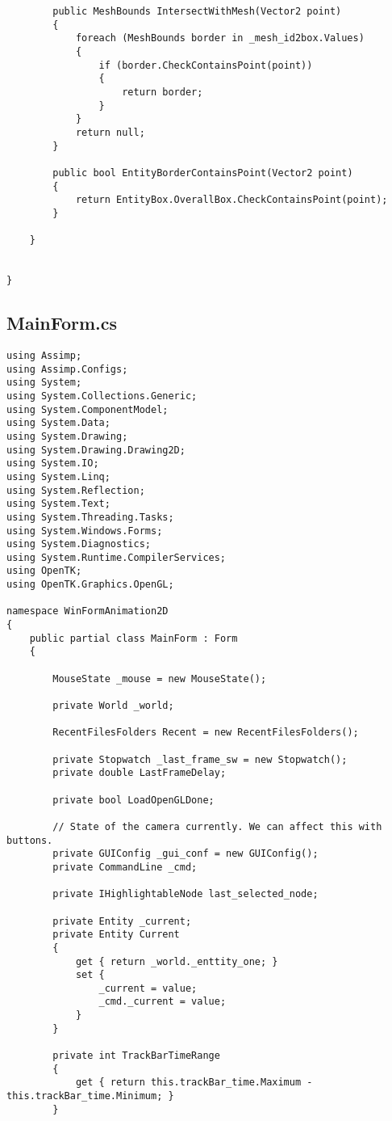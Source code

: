 \begin{scriptsize}
\begin{verbatim}
        public MeshBounds IntersectWithMesh(Vector2 point)
        {
            foreach (MeshBounds border in _mesh_id2box.Values)
            {
                if (border.CheckContainsPoint(point))
                {
                    return border;
                }
            }
            return null;
        }

        public bool EntityBorderContainsPoint(Vector2 point)
        {
            return EntityBox.OverallBox.CheckContainsPoint(point);
        }

    }


}

\end{verbatim}
\subsection{MainForm.cs}
\begin{verbatim}
using Assimp;
using Assimp.Configs;
using System;
using System.Collections.Generic;
using System.ComponentModel;
using System.Data;
using System.Drawing;
using System.Drawing.Drawing2D;
using System.IO;
using System.Linq;
using System.Reflection;
using System.Text;
using System.Threading.Tasks;
using System.Windows.Forms;
using System.Diagnostics;
using System.Runtime.CompilerServices;
using OpenTK;
using OpenTK.Graphics.OpenGL;

namespace WinFormAnimation2D
{
    public partial class MainForm : Form
    {

        MouseState _mouse = new MouseState();

        private World _world;

        RecentFilesFolders Recent = new RecentFilesFolders();

        private Stopwatch _last_frame_sw = new Stopwatch();
        private double LastFrameDelay;

        private bool LoadOpenGLDone;

        // State of the camera currently. We can affect this with buttons.
        private GUIConfig _gui_conf = new GUIConfig();
        private CommandLine _cmd;

        private IHighlightableNode last_selected_node;

        private Entity _current;
        private Entity Current
        {
            get { return _world._enttity_one; }
            set {
                _current = value;
                _cmd._current = value;
            }
        }

        private int TrackBarTimeRange
        {
            get { return this.trackBar_time.Maximum - this.trackBar_time.Minimum; }
        }


\end{verbatim}
\end{scriptsize}
